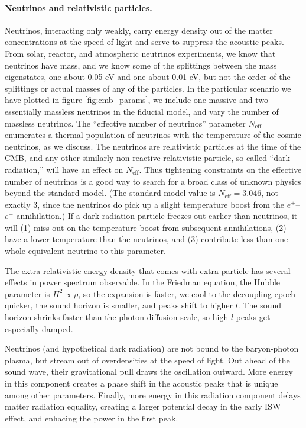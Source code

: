 \paragraph{Neutrinos and relativistic particles.}  Neutrinos, interacting only weakly, carry energy density out of the matter concentrations at the speed of light and serve to suppress the acoustic peaks.
From solar, reactor, and atmospheric neutrinos experiments, we know that neutrinos have mass, and we know some of the splittings between the mass eigenstates, one about 0.05 eV and one about 0.01 eV, but not the order of the splittings or actual masses of any of the particles.  In the particular scenario we have plotted in figure \ref{fig:cmb_params}, we include one massive and two essentially massless neutrinos in the fiducial model, and vary the number of massless neutrinos.  The ``effective number of neutrinos'' parameter $N_\textrm{eff}$ enumerates a thermal population of neutrinos with the temperature of the cosmic neutrinos, as we discuss.  The neutrinos are relativistic particles at the time of the CMB, and any other similarly non-reactive relativistic particle, so-called ``dark radiation,'' will have an effect on  $N_\textrm{eff}$.  Thus tightening constraints on the effective number of neutrinos is a good way to search for a broad class of unknown physics beyond the standard model. (The standard model value is $N_\textrm{eff} = 3.046$, not exactly 3, since the neutrinos do pick up a slight temperature boost from the $e^+$--$e^-$ annihilation.)  If a dark radiation particle freezes out earlier than neutrinos, it will (1) miss out on the temperature boost from subsequent annihilations, (2) have a lower temperature than the neutrinos, and (3) contribute less than one whole equivalent neutrino to this parameter.

The extra relativistic energy density that comes with extra particle has several effects in power spectrum observable.  In the Friedman equation, the  Hubble parameter is $H^2 \propto \rho$, so the expansion is faster, we cool to the decoupling epoch quicker, the sound horizon is smaller, and peaks shift to higher $l$.  The sound horizon shrinks faster than the photon diffusion scale, so high-$l$ peaks get especially damped.

Neutrinos (and hypothetical dark radiation) are not bound to the baryon-photon plasma, but stream out of overdensities at the speed of light.  Out ahead of the sound wave, their gravitational pull draws the oscillation outward.  More energy in this component creates a phase shift in the acoustic peaks that is unique among other parameters.  Finally, more energy in this radiation component delays matter radiation equality, creating a larger potential decay in the early ISW effect, and enhacing the power in the first peak.

